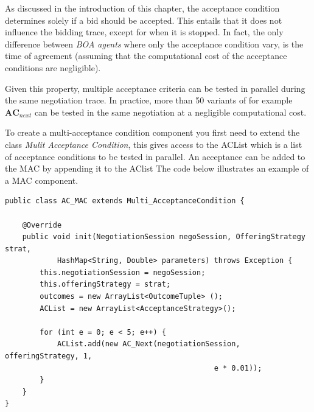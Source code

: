 \documentclass[]{article}
\begin{document}
As discussed in the introduction of this chapter, the acceptance condition determines solely if a bid should be accepted. This entails that it does not influence the bidding trace, except for when it is stopped. In fact, the only difference between \textit{BOA agents} where only the acceptance condition vary, is the time of agreement (assuming that the computational cost of the acceptance conditions are negligible).

Given this property, multiple acceptance criteria can be tested in parallel during the same negotiation trace. In practice, more than 50 variants of for example $\textbf{AC}_{next}$ can be tested in the same negotiation at a negligible computational cost.

To create a multi-acceptance condition component you first need to extend the class \textit{Mulit Acceptance Condition}, this gives access to the ACList which is a list of acceptance conditions to be tested in parallel. An acceptance can be added to the MAC by appending it to the AClist The code below illustrates an example of a MAC component.

\begin{lstlisting}
public class AC_MAC extends Multi_AcceptanceCondition {

	@Override
	public void init(NegotiationSession negoSession, OfferingStrategy strat, 
			HashMap<String, Double> parameters) throws Exception {
		this.negotiationSession = negoSession;
		this.offeringStrategy = strat;
		outcomes = new ArrayList<OutcomeTuple> ();
		ACList = new ArrayList<AcceptanceStrategy>();
		
		for (int e = 0; e < 5; e++) {
			ACList.add(new AC_Next(negotiationSession, offeringStrategy, 1, 
												e * 0.01));
		}
	}
}

\end{lstlisting}


%
%
\end{document}
